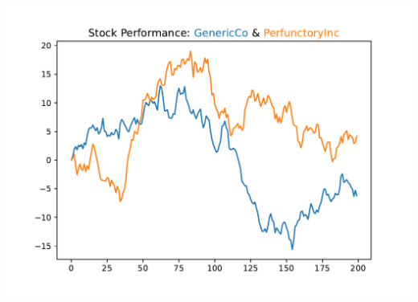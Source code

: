 
\begin{center}
    \includegraphics[width = .7\textwidth]{figures/proseplots/multicolor-title.pdf}
\end{center}


